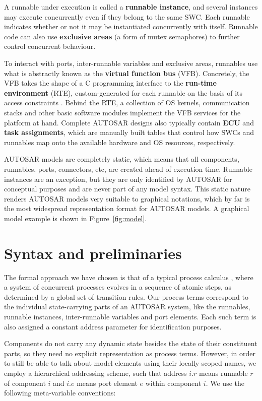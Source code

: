 \documentclass[10pt,conference]{IEEEtran}
\begin{document}
A runnable under execution is called a \textbf{runnable instance}, and several instances may execute concurrently even if they belong to the same SWC. Each runnable indicates whether or not it may be instantiated concurrently with itself. Runnable code can also use \textbf{exclusive areas} (a form of mutex semaphores) to further control concurrent behaviour.

To interact with ports, inter-runnable variables and exclusive areas, runnables use what is abstractly known as the \textbf{virtual function bus} (VFB). Concretely, the VFB takes the shape of a C programming interface to the \textbf{run-time environment} (RTE), custom-generated for each runnable on the basis of its access constraints \cite{AR:RTE}. Behind the RTE, a collection of OS kernels, communication stacks and other basic software modules implement the VFB services for the platform at hand. Complete AUTOSAR designs also typically contain \textbf{ECU} and \textbf{task assignments}, which are manually built tables that control how SWCs and runnables map onto the available hardware and OS resources, respectively.

AUTOSAR models are completely static, which means that all components, runnables, ports, connectors, etc, are created ahead of execution time. Runnable instances are an exception, but they are only identified by AUTOSAR for conceptual purposes and are never part of any model syntax. This static nature renders AUTOSAR models very suitable to graphical notations, which by far is the most widespread representation format for AUTOSAR models. A graphical model example is shown in Figure~\ref{fig:model}.


\section{Syntax and preliminaries}
\label{sec:Calc}

The formal approach we have chosen is that of a typical process calculus \cite{milner:ComMob}, where a system of concurrent processes evolves in a sequence of atomic steps, as determined by a global set of transition rules. Our process terms correspond to the individual state-carrying parts of an AUTOSAR system, like the runnables, runnable instances, inter-runnable variables and port elements. Each such term is also assigned a constant address parameter for identification purposes.

Components do not carry any dynamic state besides the state of their constituent parts, so they need no explicit representation as process terms. However, in order to still be able to talk about model elements using their locally scoped names, we employ a hierarchical addressing scheme, such that address $i.r$ means runnable $r$ of component $i$ and $i.e$ means port element $e$ within component $i$. We use the following meta-variable conventions:
\end{document}

